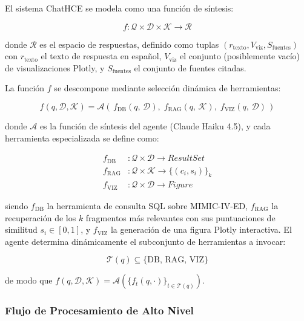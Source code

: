 El sistema ChatHCE se modela como una función de síntesis:

\begin{equation}
f: \mathcal{Q} \times \mathcal{D} \times \mathcal{K} \rightarrow \mathcal{R}
\label{eq:sistema}
\end{equation}

donde $\mathcal{R}$ es el espacio de respuestas, definido como tuplas $(r_\text{texto}, V_\text{viz}, S_\text{fuentes})$ con $r_\text{texto}$ el texto de respuesta en español, $V_\text{viz}$ el conjunto (posiblemente vacío) de visualizaciones Plotly, y $S_\text{fuentes}$ el conjunto de fuentes citadas.

La función $f$ se descompone mediante selección dinámica de herramientas:

\begin{equation}
f(q, \mathcal{D}, \mathcal{K}) = \mathcal{A}\!\left(\,f_\text{DB}(q,\,\mathcal{D}),\; f_\text{RAG}(q,\,\mathcal{K}),\; f_\text{VIZ}(q,\,\mathcal{D})\,\right)
\label{eq:descomposicion}
\end{equation}

donde $\mathcal{A}$ es la función de síntesis del agente (Claude Haiku 4.5), y cada herramienta especializada se define como:

\begin{align}
f_\text{DB} &: \mathcal{Q} \times \mathcal{D} \rightarrow \textit{ResultSet} \label{eq:fdb}\\
f_\text{RAG} &: \mathcal{Q} \times \mathcal{K} \rightarrow \{(c_i, s_i)\}_{k} \label{eq:frag}\\
f_\text{VIZ} &: \mathcal{Q} \times \mathcal{D} \rightarrow \textit{Figure} \label{eq:fviz}
\end{align}

siendo $f_\text{DB}$ la herramienta de consulta SQL sobre MIMIC-IV-ED, $f_\text{RAG}$ la recuperación de los $k$ fragmentos más relevantes con sus puntuaciones de similitud $s_i \in [0,1]$, y $f_\text{VIZ}$ la generación de una figura Plotly interactiva. El agente determina dinámicamente el subconjunto de herramientas a invocar:

\begin{equation}
\mathcal{T}(q) \subseteq \{\text{DB},\, \text{RAG},\, \text{VIZ}\}
\label{eq:seleccion}
\end{equation}

de modo que $f(q, \mathcal{D}, \mathcal{K}) = \mathcal{A}(\{f_t(q, \cdot)\}_{t \in \mathcal{T}(q)})$.

\subsubsection{Flujo de Procesamiento de Alto Nivel}

